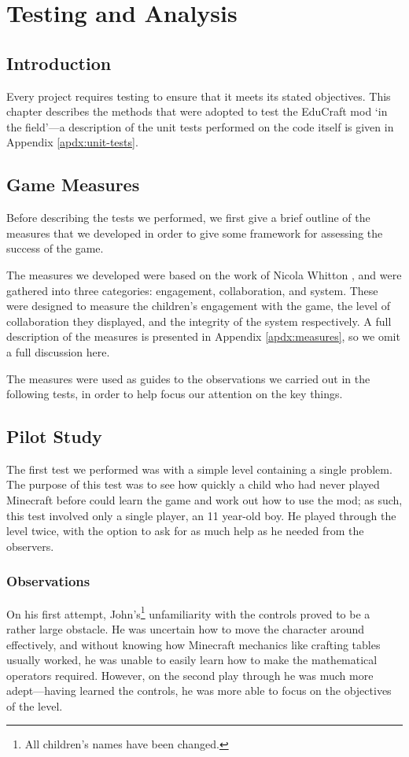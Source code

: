 \chapter{Testing and Analysis}
\label{ch:testing}

\section{Introduction}
Every project requires testing to ensure that it meets its stated objectives.
This chapter describes the methods that were adopted to test the EduCraft mod
`in the field'---a description of the unit tests performed on the code itself
is given in Appendix \ref{apdx:unit-tests}.


\section{Game Measures}
Before describing the tests we performed, we first give a brief outline of the
measures that we developed in order to give some framework for assessing the success
of the game.

The measures we developed were based on the work of Nicola Whitton \cite{whitton07},
and were gathered into three categories: engagement, collaboration, and system.
These were designed to measure the children's engagement with the game, the level
of collaboration they displayed, and the integrity of the system respectively.
A full description of the measures is presented in Appendix \ref{apdx:measures}, so
we omit a full discussion here.

The measures were used as guides to the observations we carried out in the following
tests, in order to help focus our attention on the key things.


\section{Pilot Study}
The first test we performed was with a simple level containing a single problem. The
purpose of this test was to see how quickly a child who had never played Minecraft
before could learn the game and work out how to use the mod; as such, this test
involved only a single player, an 11 year-old boy. He played through the level
twice, with the option to ask for as much help as he needed from the observers.

\subsection{Observations}
On his first attempt, John's\footnote{All children's names have been changed.} unfamiliarity
with the controls proved to be a rather large obstacle. He was uncertain how to move
the character around effectively, and without knowing how Minecraft mechanics like
crafting tables usually worked, he was unable to easily learn how to make the mathematical
operators required. However, on the second play through he was much more adept---having
learned the controls, he was more able to focus on the objectives of the level.

